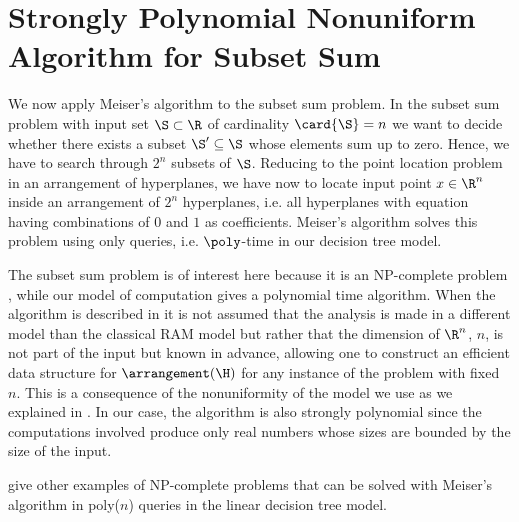 \section[Strongly Polynomial Nonuniform Algorithm \dots]{Strongly Polynomial Nonuniform Algorithm for Subset Sum}

We now apply Meiser's algorithm to the subset sum problem. In the subset sum
problem with input set $\S \subset \R$ of cardinality $\card{\S} = n$ we want to
decide whether there exists a subset $\S' \subseteq \S$ whose elements sum up to zero. Hence, we have
to search through $2^n$ subsets of $\S$. Reducing to the point location problem
in an arrangement of hyperplanes, we have now to locate input point $x \in
\R^n$ inside an arrangement of $2^n$ hyperplanes, i.e. all hyperplanes with
equation having combinations of $0$ and $1$ as coefficients. Meiser's algorithm
solves this problem using only  queries, i.e. $\poly$-time
in our decision tree model.

The subset sum problem is of interest here because it is an NP-complete problem
\cite{karp:1972}, while our model of computation gives a polynomial time
algorithm. When the algorithm is described in \cite{burgisser:1997} it is not
assumed that the analysis is made in a different model than the classical
RAM model but rather that the dimension of $\R^n$, $n$, is not part of the input
but known in advance, allowing one to construct an efficient data structure for
$\arrangement(\H)$ for any instance of the problem with fixed $n$.
This is a consequence of the nonuniformity of the model we use as we explained
in . In our case, the algorithm is
also strongly polynomial since the computations involved produce only real
numbers whose sizes are bounded by the size of the input.

\citet*{meiser:1993,burgisser:1997} give other examples of
NP-complete problems that can be solved with Meiser's algorithm in poly(\(n\))
queries in the linear decision tree model.
